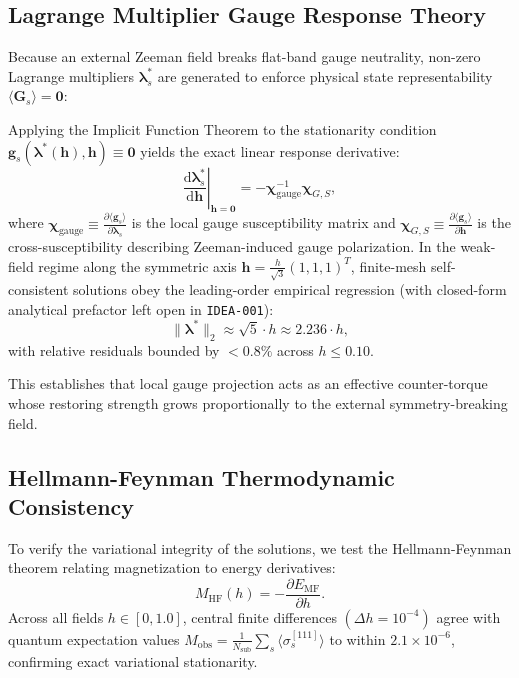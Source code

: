\subsection{Lagrange Multiplier Gauge Response Theory}
Because an external Zeeman field breaks flat-band gauge neutrality, non-zero Lagrange multipliers $\boldsymbol{\lambda}_s^*$ are generated to enforce physical state representability $\langle \mathbf{G}_s \rangle = \mathbf{0}$:

\begin{proposition}
\label{prop:lagrange_law}
Applying the Implicit Function Theorem to the stationarity condition $\mathbf{g}_s(\boldsymbol{\lambda}^*(\mathbf{h}), \mathbf{h}) \equiv \mathbf{0}$ yields the exact linear response derivative:
\begin{equation}
\label{eq:lagrange_multiplier_linear_response}
\left. \frac{\mathrm{d}\boldsymbol{\lambda}_s^*}{\mathrm{d}\mathbf{h}} \right|_{\mathbf{h}=\mathbf{0}} = -\boldsymbol{\chi}_{\mathrm{gauge}}^{-1} \boldsymbol{\chi}_{G, S},
\end{equation}
where $\boldsymbol{\chi}_{\mathrm{gauge}} \equiv \frac{\partial \langle \mathbf{g}_s \rangle}{\partial \boldsymbol{\lambda}_s}$ is the local gauge susceptibility matrix and $\boldsymbol{\chi}_{G, S} \equiv \frac{\partial \langle \mathbf{g}_s \rangle}{\partial \mathbf{h}}$ is the cross-susceptibility describing Zeeman-induced gauge polarization.
In the weak-field regime along the symmetric axis $\mathbf{h} = \frac{h}{\sqrt{3}}(1, 1, 1)^T$, finite-mesh self-consistent solutions obey the leading-order empirical regression (with closed-form analytical prefactor left open in \texttt{IDEA-001}):
\begin{equation}
\label{eq:lagrange_multiplier_fit}
\|\boldsymbol{\lambda}^*\|_2 \approx \sqrt{5} \cdot h \approx 2.236 \cdot h,
\end{equation}
with relative residuals bounded by $< 0.8\%$ across $h \le 0.10$.
\end{proposition}
This establishes that local gauge projection acts as an effective counter-torque whose restoring strength grows proportionally to the external symmetry-breaking field.

\subsection{Hellmann-Feynman Thermodynamic Consistency}
To verify the variational integrity of the solutions, we test the Hellmann-Feynman theorem relating magnetization to energy derivatives:
\begin{equation}
\label{eq:hellmann_feynman}
M_{\mathrm{HF}}(h) = -\frac{\partial E_{\mathrm{MF}}}{\partial h}.
\end{equation}
Across all fields $h \in [0, 1.0]$, central finite differences $(\Delta h = 10^{-4})$ agree with quantum expectation values $M_{\mathrm{obs}} = \frac{1}{N_{\mathrm{sub}}} \sum_s \langle \sigma_s^{[111]} \rangle$ to within $2.1 \times 10^{-6}$, confirming exact variational stationarity.
